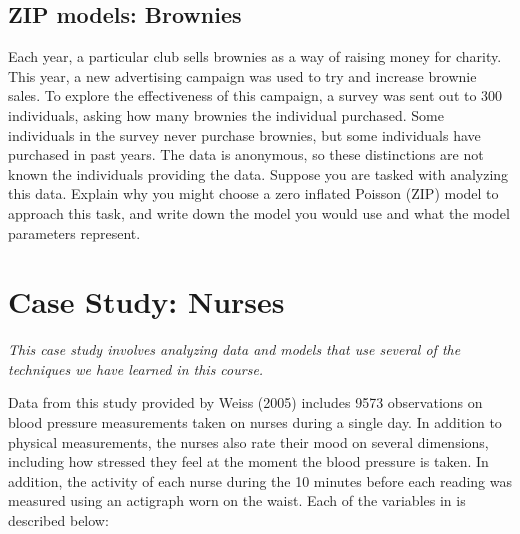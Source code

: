 \documentclass[11pt]{article}
\begin{document}
\vspace{4cm}

\subsection{ZIP models: Brownies}

Each year, a particular club sells brownies as a way of raising money for charity. This year, a new advertising campaign was used to try and increase brownie sales. To explore the effectiveness of this campaign, a survey was sent out to 300 individuals, asking how many brownies the individual purchased. Some individuals in the survey never purchase brownies, but some individuals have purchased in past years. The data is anonymous, so these distinctions are not known the individuals providing the data. Suppose you are tasked with analyzing this data. Explain why you might choose a zero inflated Poisson (ZIP) model to approach this task, and write down the model you would use and what the model parameters represent.


\newpage

\section{Case Study: Nurses}

\textit{This case study involves analyzing data and models that use several of the techniques we have learned in this course.}

Data from this study provided by Weiss (2005) includes 9573 observations on blood pressure measurements taken on nurses during a single day. In addition to physical measurements, the nurses also rate their mood on several dimensions, including how stressed they feel at the moment the blood pressure is taken. In addition, the activity of each nurse during the 10 minutes before each reading was measured using an actigraph worn on the waist. Each of the variables in is described below:
\end{document}
